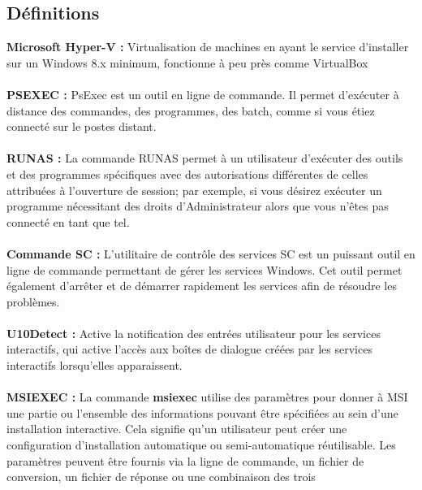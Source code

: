 \documentclass[11pt,a4paper,oneside]{article}
\begin{document}
\subsection{Définitions}
\textbf{Microsoft Hyper-V :} Virtualisation de machines en ayant le service d'installer sur un Windows 8.x minimum, fonctionne à peu près comme VirtualBox
\\ \\
\textbf{PSEXEC :} PsExec est un outil en ligne de commande. Il permet d’exécuter à distance des commandes, des programmes, des batch, comme si vous étiez connecté sur le postes distant.
\\ \\
\textbf{RUNAS :} La commande RUNAS permet à un utilisateur d'exécuter des outils et des programmes spécifiques avec des autorisations différentes de celles attribuées à l'ouverture de session; par exemple, si vous désirez exécuter un programme nécessitant des droits d'Administrateur alors que vous n'êtes pas connecté en tant que tel.
\\ \\
\textbf{Commande SC :} L'utilitaire de contrôle des services SC est un puissant outil en ligne de commande permettant de gérer les services Windows. Cet outil permet également d'arrêter et de démarrer rapidement les services afin de résoudre les problèmes.
\\ \\
\textbf{U10Detect :} Active la notification des entrées utilisateur pour les services interactifs, qui active l'accès aux boîtes de dialogue créées par les services interactifs lorsqu'elles apparaissent.
\\ \\
\textbf{MSIEXEC :} La commande \textbf{msiexec} utilise des paramètres pour donner à MSI une partie ou l'ensemble des informations pouvant être spécifiées au sein d'une installation interactive. Cela signifie qu'un utilisateur peut créer une configuration d'installation automatique ou semi-automatique réutilisable. Les paramètres peuvent être fournis via la ligne de commande, un fichier de conversion, un fichier de réponse ou une combinaison des trois
\newpage
\end{document}
